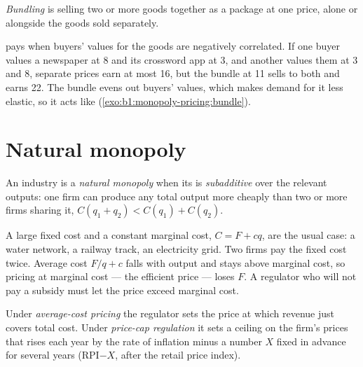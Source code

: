 \begin{definition}[Bundling]\label{def:b1:monopoly-pricing:bundling}
\emph{Bundling} is selling two or more goods together as a package at one
price, alone or alongside the goods sold separately.
\end{definition}

 pays when buyers' values for the goods are negatively correlated.
If one buyer values a newspaper at 8 and its crossword app at 3, and another
values them at 3 and 8, separate prices earn at most 16, but the bundle at 11
sells to both and earns 22. The bundle evens out buyers' values, which
makes demand for it less elastic, so it acts like 
(\cref{exo:b1:monopoly-pricing:bundle}).

\section{Natural monopoly}\label{sec:b1:monopoly-pricing:natural}

\begin{definition}\label{def:b1:monopoly-pricing:natural-monopoly}
An industry is a \emph{natural monopoly} when its  is
\emph{subadditive} over the relevant outputs: one firm can produce any total
output more cheaply than two or more firms sharing it,
$C(q_1 + q_2) < C(q_1) + C(q_2)$.
\end{definition}

A large fixed cost and a constant marginal cost, $C = F + cq$, are the usual
case: a water network, a railway track, an electricity grid. Two firms pay
the fixed cost twice. Average cost $F/q + c$ falls with output and stays above
marginal cost, so pricing at marginal cost --- the efficient price --- loses
$F$. A regulator who will not pay a subsidy must let the price exceed
marginal cost.

\begin{definition}\label{def:b1:monopoly-pricing:regulation}
Under \emph{average-cost pricing} the regulator sets the price at which
revenue just covers total cost. Under \emph{price-cap regulation} it sets a
ceiling on the firm's prices that rises each year by the rate of inflation
minus a number $X$ fixed in advance for several years (RPI$-X$, after the
retail price index).
\end{definition}

